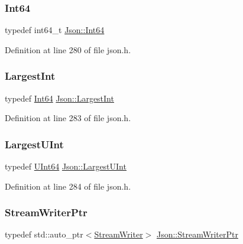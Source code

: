 \subsubsection{\texorpdfstring{Int64}{Int64}}
{\footnotesize\ttfamily typedef int64\+\_\+t \hyperlink{namespace_json_ac62566f36fd33115957b91305c9ed1dc}{Json\+::\+Int64}}



Definition at line 280 of file json.\+h.

\mbox{\label{namespace_json_a218d880af853ce786cd985e82571d297}} 
\subsubsection{\texorpdfstring{Largest\+Int}{LargestInt}}
{\footnotesize\ttfamily typedef \hyperlink{namespace_json_ac62566f36fd33115957b91305c9ed1dc}{Int64} \hyperlink{namespace_json_a218d880af853ce786cd985e82571d297}{Json\+::\+Largest\+Int}}



Definition at line 283 of file json.\+h.

\mbox{\label{namespace_json_ae202ecad69725e23443f465e257456d0}} 
\subsubsection{\texorpdfstring{Largest\+U\+Int}{LargestUInt}}
{\footnotesize\ttfamily typedef \hyperlink{namespace_json_adf3fa5cb60c619e4f02315ad355e0ca1}{U\+Int64} \hyperlink{namespace_json_ae202ecad69725e23443f465e257456d0}{Json\+::\+Largest\+U\+Int}}



Definition at line 284 of file json.\+h.

\mbox{\label{namespace_json_a7132404aeebfc96d7c6ad2c66260afb5}} 
\subsubsection{\texorpdfstring{Stream\+Writer\+Ptr}{StreamWriterPtr}}
{\footnotesize\ttfamily typedef std\+::auto\+\_\+ptr$<$\hyperlink{class_json_1_1_stream_writer}{Stream\+Writer}$>$ \hyperlink{namespace_json_a7132404aeebfc96d7c6ad2c66260afb5}{Json\+::\+Stream\+Writer\+Ptr}}



